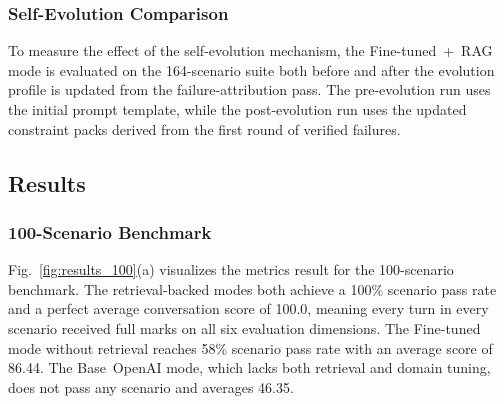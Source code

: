 \documentclass[journal]{IEEEtran}
\begin{document}
\subsubsection{Self-Evolution Comparison}

To measure the effect of the self-evolution mechanism, the Fine-tuned~+~RAG mode is evaluated on the 164-scenario suite both before and after the evolution profile is updated from the failure-attribution pass.
The pre-evolution run uses the initial prompt template, while the post-evolution run uses
the updated constraint packs derived from the first round of verified failures.

\subsection{Results}
\label{subsec:results}

\subsubsection{100-Scenario Benchmark}

Fig.~\ref{fig:results_100}(a) visualizes the metrics result for the 100-scenario benchmark.
The retrieval-backed modes both achieve a 100\% scenario pass rate and a perfect average conversation score of 100.0, meaning every turn in every scenario received full marks on all six evaluation dimensions.
The Fine-tuned mode without retrieval reaches 58\% scenario pass rate with an average score of 86.44.
The Base~OpenAI mode, which lacks both retrieval and domain tuning, does not pass any scenario and averages 46.35.

\end{document}
